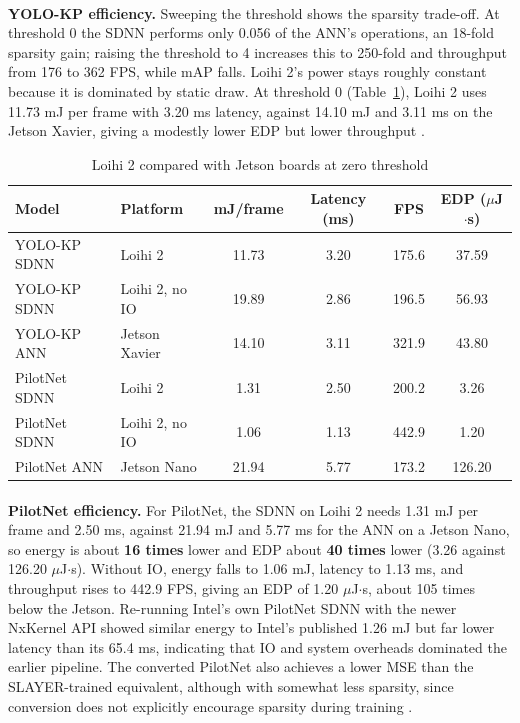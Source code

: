 \documentclass[12pt,a4paper,final]{extreport}
\begin{document}
\paragraph{} \textbf{YOLO-KP efficiency.} Sweeping the threshold shows the sparsity trade-off. At threshold 0 the SDNN performs only 0.056 of the ANN's operations, an 18-fold sparsity gain; raising the threshold to 4 increases this to 250-fold and throughput from 176 to 362 FPS, while mAP falls. Loihi 2's power stays roughly constant because it is dominated by static draw. At threshold 0 (Table~\ref{tab:p4_perf}), Loihi 2 uses 11.73 mJ per frame with 3.20 ms latency, against 14.10 mJ and 3.11 ms on the Jetson Xavier, giving a modestly lower EDP but lower throughput \cite{p4}.

{\renewcommand{\arraystretch}{1.12}
\begin{table}[htbp]
\centering
\caption{Loihi 2 compared with Jetson boards at zero threshold \cite{p4}}\label{tab:p4_perf}
\small
\setlength{\tabcolsep}{4pt}
\begin{tabular}{|l|l|c|c|c|c|}
\hline
\textbf{Model} & \textbf{Platform} & \textbf{mJ/frame} & \textbf{Latency (ms)} & \textbf{FPS} & \textbf{EDP ($\mu$J$\cdot$s)} \\ \hline
YOLO-KP SDNN & Loihi 2 & 11.73 & 3.20 & 175.6 & 37.59 \\ \hline
YOLO-KP SDNN & Loihi 2, no IO & 19.89 & 2.86 & 196.5 & 56.93 \\ \hline
YOLO-KP ANN & Jetson Xavier & 14.10 & 3.11 & 321.9 & 43.80 \\ \hline
PilotNet SDNN & Loihi 2 & 1.31 & 2.50 & 200.2 & 3.26 \\ \hline
PilotNet SDNN & Loihi 2, no IO & 1.06 & 1.13 & 442.9 & 1.20 \\ \hline
PilotNet ANN & Jetson Nano & 21.94 & 5.77 & 173.2 & 126.20 \\ \hline
\end{tabular}
\end{table}}

\paragraph{} \textbf{PilotNet efficiency.} For PilotNet, the SDNN on Loihi 2 needs 1.31 mJ per frame and 2.50 ms, against 21.94 mJ and 5.77 ms for the ANN on a Jetson Nano, so energy is about \textbf{16 times} lower and EDP about \textbf{40 times} lower (3.26 against 126.20 $\mu$J$\cdot$s). Without IO, energy falls to 1.06 mJ, latency to 1.13 ms, and throughput rises to 442.9 FPS, giving an EDP of 1.20 $\mu$J$\cdot$s, about 105 times below the Jetson. Re-running Intel's own PilotNet SDNN with the newer NxKernel API showed similar energy to Intel's published 1.26 mJ but far lower latency than its 65.4 ms, indicating that IO and system overheads dominated the earlier pipeline. The converted PilotNet also achieves a lower MSE than the SLAYER-trained equivalent, although with somewhat less sparsity, since conversion does not explicitly encourage sparsity during training \cite{p4}.
\end{document}
